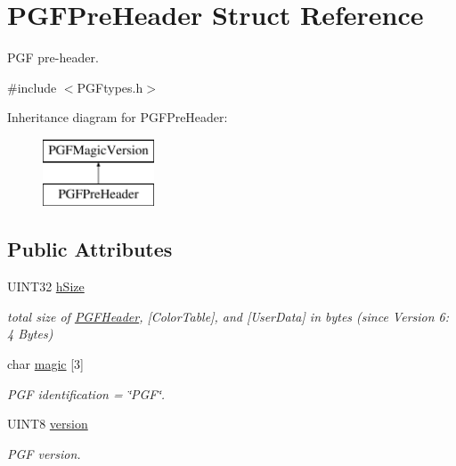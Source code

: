 \hypertarget{structPGFPreHeader}{}\section{P\+G\+F\+Pre\+Header Struct Reference}
\label{structPGFPreHeader}


P\+GF pre-\/header.  




{\ttfamily \#include $<$P\+G\+Ftypes.\+h$>$}

Inheritance diagram for P\+G\+F\+Pre\+Header\+:\begin{figure}[H]
\begin{center}
\leavevmode
\includegraphics[height=2.000000cm]{structPGFPreHeader}
\end{center}
\end{figure}
\subsection*{Public Attributes}
\begin{DoxyCompactItemize}
\item 
U\+I\+N\+T32 \mbox{\hyperlink{structPGFPreHeader_a71b1463b71b722459dad25a3ef0b492b}{h\+Size}}
\begin{DoxyCompactList}\small\item\em total size of \mbox{\hyperlink{structPGFHeader}{P\+G\+F\+Header}}, \mbox{[}Color\+Table\mbox{]}, and \mbox{[}User\+Data\mbox{]} in bytes (since Version 6\+: 4 Bytes) \end{DoxyCompactList}\item 
char \mbox{\hyperlink{structPGFMagicVersion_a8b27eabb723f35b4fdb9e357e69b334b}{magic}} \mbox{[}3\mbox{]}
\begin{DoxyCompactList}\small\item\em P\+GF identification = \char`\"{}\+P\+G\+F\char`\"{}. \end{DoxyCompactList}\item 
U\+I\+N\+T8 \mbox{\hyperlink{structPGFMagicVersion_aa7ff5e50537cac9dd4c62d4c8982d09d}{version}}
\begin{DoxyCompactList}\small\item\em P\+GF version. \end{DoxyCompactList}\end{DoxyCompactItemize}


